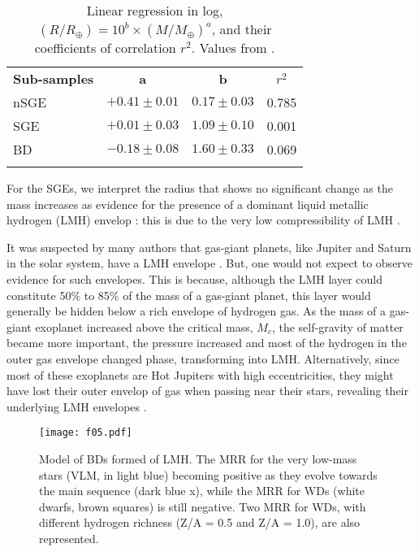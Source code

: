 \begin{table}[t]
\centering
\caption{Linear regression in log, $(R/R_{\oplus}) = 10^{b}\times (M/M_{\oplus})^a$, and their coefficients of correlation $r^2$.
Values from \cite{Torres2016}.}
\begin{tabular}{l c c c}
\noalign{\smallskip}\hline\hline\noalign{\smallskip}
\textbf{Sub-samples} & \textbf{a} & \textbf{b} & $r^2$\\
\noalign{\smallskip}\hline\noalign{\smallskip}
nSGE & $+0.41 \pm 0.01$ & $0.17 \pm 0.03$ & 0.785 \\
SGE & $+0.01 \pm 0.03$ & $1.09 \pm 0.10$ & 0.001 \\
BD & $-0.18 \pm 0.08$ & $1.60 \pm 0.33$ & 0.069 \\
\noalign{\smallskip}\hline
\end{tabular}
\label{tab:Tor1}
\end{table}

For the SGEs, we interpret the radius that shows no significant change as the mass increases as evidence for the presence of a dominant liquid metallic hydrogen (LMH) envelop \citep{Wigner1935,Hubbard1997,Dalladay-Simpson2016}: this is due to the very low compressibility of LMH \citep{Hubbard1997}. 

It was suspected by many authors that gas-giant planets, 
like Jupiter and Saturn in the solar system, have a LMH envelope \citep[see][and reference therein]{Burrows1993}. 
But, one would not expect to observe evidence for such envelopes. This is because, although the LMH layer could constitute 50\% to 85\% of the 
mass of a gas-giant planet, this layer would generally be hidden below a rich envelope of hydrogen gas. 
As the mass of a gas-giant exoplanet increased above the critical mass, $M_c$, the self-gravity of 
matter became more important, the pressure increased and most of 
the hydrogen in the outer gas envelope changed phase, transforming into LMH. 
Alternatively, since most of these exoplanets are Hot Jupiters with high eccentricities, they might have lost their outer envelop of gas when passing near their stars, revealing their underlying LMH envelopes \citep{Torres2016}. 

\begin{figure}[ht]
\centering
\texttt{[image: f05.pdf]}
\caption{Model of BDs formed of LMH. 
The MRR for the very low-mass stars (VLM, in light blue) becoming positive as they evolve towards the main sequence (dark blue x), 
while the MRR for WDs (white dwarfs, brown squares) is still negative. 
Two MRR for WDs, with different hydrogen richness (Z/A = 0.5 and Z/A = 1.0), are also represented. }
\label{fig:figTor3}
\end{figure}

